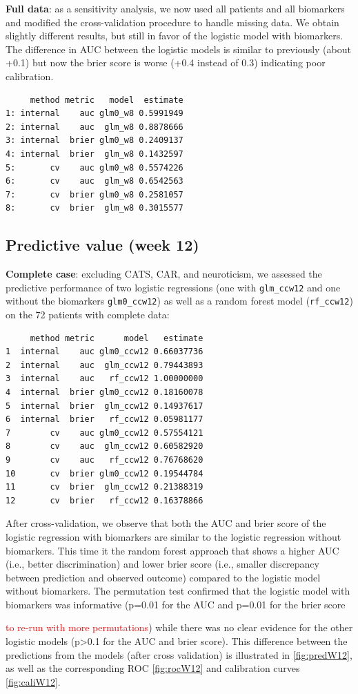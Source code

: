 \documentclass[12pt]{article}
\newcommand\Warning[1][3ex]{%
\renewcommand\stacktype{L}%
\scaleto{\stackon[1.3pt]{\color{red}$\triangle$}{\tiny\bfseries !}}{#1}%
\xspace
}
\begin{document}
\bigskip

\textbf{Full data}: as a sensitivity analysis, we now used all patients and
all biomarkers and modified the cross-validation procedure to handle
missing data. We obtain slightly different results, but still in favor
of the logistic model with biomarkers. The difference in AUC between
the logistic models is similar to previously (about +0.1) but now the
brier score is worse (+0.4 instead of 0.3) indicating poor
calibration.

\begin{verbatim}
     method metric   model  estimate
1: internal    auc glm0_w8 0.5991949
2: internal    auc  glm_w8 0.8878666
3: internal  brier glm0_w8 0.2409137
4: internal  brier  glm_w8 0.1432597
5:       cv    auc glm0_w8 0.5574226
6:       cv    auc  glm_w8 0.6542563
7:       cv  brier glm0_w8 0.2581057
8:       cv  brier  glm_w8 0.3015577
\end{verbatim}



\clearpage

\subsection{Predictive value (week 12)}
\label{sec:org0464d4e}

\textbf{Complete case}: excluding CATS, CAR, and neuroticism, we assessed the
predictive performance of two logistic regressions (one with
\texttt{glm\_ccw12} and one without the biomarkers \texttt{glm0\_ccw12}) as well as a
random forest model (\texttt{rf\_ccw12}) on the 72 patients with complete data:
\begin{verbatim}
     method metric      model   estimate
1  internal    auc glm0_ccw12 0.66037736
2  internal    auc  glm_ccw12 0.79443893
3  internal    auc   rf_ccw12 1.00000000
4  internal  brier glm0_ccw12 0.18160078
5  internal  brier  glm_ccw12 0.14937617
6  internal  brier   rf_ccw12 0.05981177
7        cv    auc glm0_ccw12 0.57554121
8        cv    auc  glm_ccw12 0.60582920
9        cv    auc   rf_ccw12 0.76768620
10       cv  brier glm0_ccw12 0.19544784
11       cv  brier  glm_ccw12 0.21388319
12       cv  brier   rf_ccw12 0.16378866
\end{verbatim}

After cross-validation, we observe that both the AUC and brier score
of the logistic regression with biomarkers are similar to the logistic
regression without biomarkers. This time it the random forest approach
that shows a higher AUC (i.e., better discrimination) and lower brier
score (i.e., smaller discrepancy between prediction and observed
outcome) compared to the logistic model without biomarkers. The
permutation test confirmed that the logistic model with biomarkers was
informative (p=0.01 for the AUC and p=0.01 for the brier score
\Warning \textcolor{red}{to re-run with more permutations}) while
there was no clear evidence for the other logistic models (p>0.1 for
the AUC and brier score). This difference between the predictions from
the models (after cross validation) is illustrated in
\autoref{fig:predW12}, as well as the corresponding ROC
\autoref{fig:rocW12} and calibration curves \autoref{fig:caliW12}.
\end{document}
